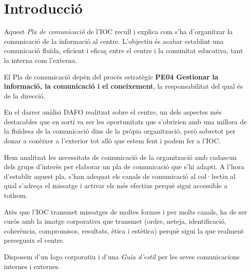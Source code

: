 \documentclass[fontsize=10pt,%
paper=a4,%
DIV=14,%
pagesize=auto,%
parskip=half,
captions=tableheading,%
numbers=noenddot,%
toc=graduated%
]{scrartcl}
\begin{document}



\thispagestyle{empty}
\setcounter{tocdepth}{4}
\tableofcontents

\clearpage

\pagestyle{scrheadings}


\section{Introducció}\label{sec:intro}

Aquest \textit{Pla de comunicació} de l'IOC recull i explica com s'ha d'organitzar la comunicació de la informació al centre. L'objectiu és acabar establint una comunicació fluïda, eficient i eficaç entre el centre i la comunitat educativa, tant la interna com l'externa.

El Pla de comunicació depèn del procés estratègic \textbf{PE04 Gestionar la informació, la comunicació i el coneixement}, la responsabilitat del qual és de la direcció.

En el darrer anàlisi DAFO realitzat sobre el centre, un dels aspectes més destacables que en sortí va ser les oportunitats que s'obririen amb una millora de la fluïdesa de la comunicació dins de la pròpia organització, però sobretot per donar a conèixer a l'exterior tot allò que estem fent i podem fer a l'IOC.

Hem analitzat les necessitats de comunicació de la organització amb cadascun dels grups d'interès per elaborar un pla de comunicació que s'hi adapti. A l'hora
d'establir aquest pla, s'han adequat els canals de comunicació al col·lectiu al qual s'adreça el missatge i activar els més efectius perquè sigui accessible a tothom.

Atès que l'IOC transmet missatges de moltes formes i per molts canals, ha de ser curós amb la imatge corporativa que transmet (ordre, neteja, identificació,
coherència, compromisos, resultats, ètica i estètica) perquè sigui la que realment persegueix el centre.

Disposem d'un logo corporatiu i d'una \textit{Guia d'estil} per les seves comunicacions internes i externes.
\end{document}
